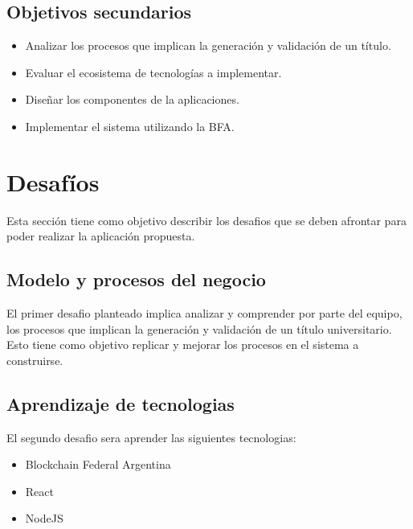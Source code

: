 \documentclass[11pt,a4paper]{article}
\begin{document}
        \subsection{Objetivos secundarios}

        \begin{itemize}
            \item Analizar los procesos que implican la generación y validación de un título.
            \item Evaluar el ecosistema de tecnologías a implementar.
            \item Diseñar los componentes de la aplicaciones.
            \item Implementar el sistema utilizando la BFA. 
        \end{itemize}


    \section{Desafíos}

        Esta sección tiene como objetivo describir los desafios que se deben afrontar para poder realizar la aplicación propuesta.

        \subsection{Modelo y procesos del negocio} 

            El primer desafio planteado implica analizar y comprender por parte del equipo, los procesos que implican la 
            generación y validación de un título universitario. Esto tiene como objetivo replicar y mejorar los procesos 
            en el sistema a construirse.
        
        \subsection{Aprendizaje de tecnologias} 

            El segundo desafio sera aprender las siguientes tecnologias:
            
            \begin{itemize}
                \item Blockchain Federal Argentina
                \item React
                \item NodeJS
            \end{itemize}
            
\end{document}
